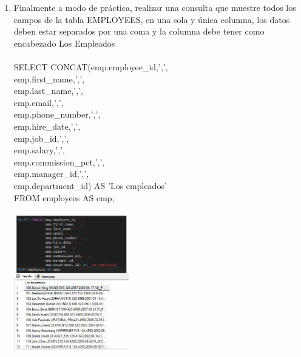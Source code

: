 \begin{enumerate}[1.]
	\item Finalmente a modo de práctica, realizar una consulta que muestre todos los campos de la tabla EMPLOYEES, en una sola y única columna, los datos deben estar separados por una coma y la columna debe tener como encabezado Los Empleados
	\\
	\\SELECT CONCAT(emp.employee\_id,',', \\
			  emp.first\_name,',', \\
			  emp.last\_name,',', \\
			  emp.email,',', \\
			  emp.phone\_number,',', \\
			  emp.hire\_date,',', \\
			  emp.job\_id,',', \\
			  emp.salary,',', \\
			  emp.commission\_pct,',', \\
			  emp.manager\_id,',', \\
			  emp.department\_id) AS 'Los empleados' \\
	FROM employees AS emp; \\
	\begin{center}
	\includegraphics[width=5cm]{./Imagenes/actividad0303} 
	\end{center}

\end{enumerate}



